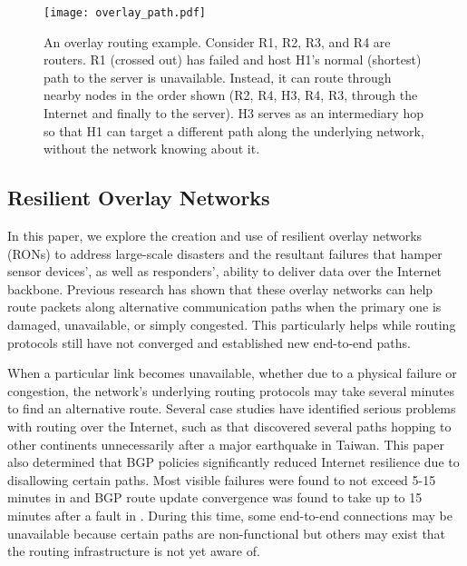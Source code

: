 \documentclass[conference]{IEEEtran}
\begin{document}
\begin{figure}[!t]
\centering
\texttt{[image: overlay\_path.pdf]}
\caption{An overlay routing example.  Consider R1, R2, R3, and R4 are routers.  R1 (crossed out) has failed and host H1's normal (shortest) path to the server is unavailable.  Instead, it can route through nearby nodes in the order shown (R2, R4, H3, R4, R3, through the Internet and finally to the server).  H3 serves as an intermediary hop so that H1 can target a different path along the underlying network, without the network knowing about it.}
\label{fig_overlay_path}
\end{figure}

\subsection{Resilient Overlay Networks}

In this paper, we explore the creation and use of resilient overlay networks (RONs) to address large-scale disasters and the resultant failures that hamper sensor devices', as well as responders', ability to deliver data over the Internet backbone.
Previous research \cite{ron,reactive_routing} has shown that these overlay networks can help route packets along alternative communication paths when the primary one is damaged, unavailable, or simply congested.
This particularly helps while routing protocols still have not converged and established new end-to-end paths.


When a particular link becomes unavailable, whether due to a physical failure or congestion, the network's underlying routing protocols may take several minutes to find an alternative route.
Several case studies have identified serious problems with routing over the Internet, such as \cite{routing_resilience_analysis} that discovered several paths hopping to other continents unnecessarily after a major earthquake in Taiwan.
This paper also determined that BGP policies significantly reduced Internet resilience due to disallowing certain paths.
Most visible failures were found to not exceed 5-15 minutes in \cite{reactive_routing} and BGP route update convergence was found to take up to 15 minutes after a fault in \cite{route_convergence}.
During this time, some end-to-end connections may be unavailable because certain paths are non-functional but others may exist that the routing infrastructure is not yet aware of.
\end{document}
